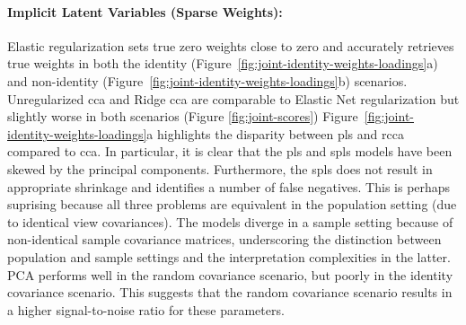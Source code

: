 \paragraph{Implicit Latent Variables (Sparse Weights):} Elastic regularization sets true zero weights close to zero and accurately retrieves true weights in both the identity (Figure~\ref{fig:joint-identity-weights-loadings}a) and non-identity (Figure~\ref{fig:joint-identity-weights-loadings}b) scenarios.
Unregularized \acrshort{cca} and Ridge \acrshort{cca} are comparable to Elastic Net regularization but slightly worse in both scenarios (Figure \ref{fig:joint-scores})
Figure~\ref{fig:joint-identity-weights-loadings}a highlights the disparity between \acrshort{pls} and \acrshort{rcca} compared to \acrshort{cca}.
In particular, it is clear that the \acrshort{pls} and \acrshort{spls} models have been skewed by the principal components.
Furthermore, the \acrshort{spls} does not result in appropriate shrinkage and identifies a number of false negatives.
This is perhaps suprising because all three problems are equivalent in the population setting (due to identical view covariances).
The models diverge in a sample setting because of non-identical sample covariance matrices, underscoring the distinction between population and sample settings and the interpretation complexities in the latter.
PCA performs well in the random covariance scenario, but poorly in the identity covariance scenario.
This suggests that the random covariance scenario results in a higher signal-to-noise ratio for these parameters.

